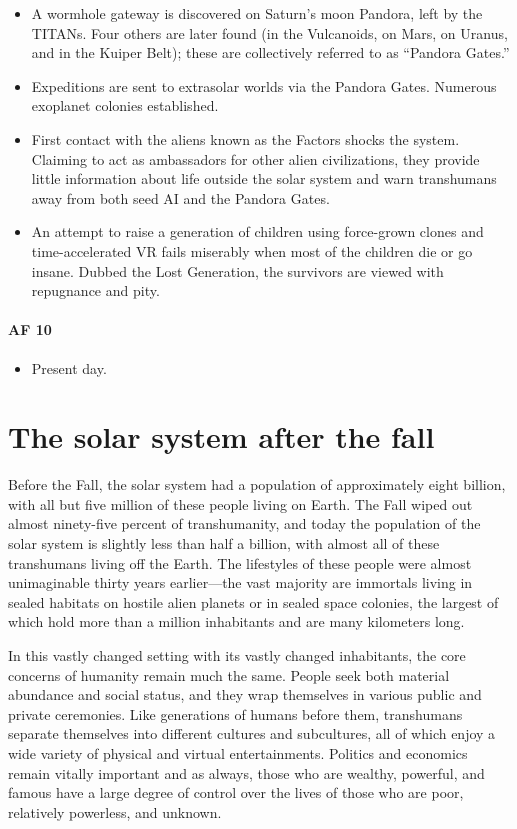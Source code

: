 \begin{itemize}
\item A wormhole gateway is discovered on Saturn's moon Pandora, left by the TITANs. Four others are later found (in the Vulcanoids, on Mars, on Uranus, and in the Kuiper Belt); these are collectively referred to as ``Pandora Gates.''
\item Expeditions are sent to extrasolar worlds via the Pandora Gates. Numerous exoplanet colonies established.
\item First contact with the aliens known as the Factors shocks the system. Claiming to act as ambassadors for other alien civilizations, they provide little information about life outside the solar system and warn transhumans away from both seed AI and the Pandora Gates.
\item An attempt to raise a generation of children using force-grown clones and time-accelerated VR fails miserably when most of the children die or go insane. Dubbed the Lost Generation, the survivors are viewed with repugnance and pity.
\end{itemize}  \paragraph{AF 10}  \begin{itemize}
\item Present day.
\end{itemize} 

\section{The solar system after the fall}
\label{sec:solar-system-after} 

Before the Fall, the solar system had a population of approximately eight billion, with all but five million of these people living on Earth. The Fall wiped out almost ninety-five percent of transhumanity, and today the population of the solar system is slightly less than half a billion, with almost all of these transhumans living off the Earth. The lifestyles of these people were almost unimaginable thirty years earlier—the vast majority are immortals living in sealed habitats on hostile alien planets or in sealed space colonies, the largest of which hold more than a million inhabitants and are many kilometers long. 

In this vastly changed setting with its vastly changed inhabitants, the core concerns of humanity remain much the same. People seek both material abundance and social status, and they wrap themselves in various public and private ceremonies. Like generations of humans before them, transhumans separate themselves into different cultures and subcultures, all of which enjoy a wide variety of physical and virtual entertainments. Politics and economics remain vitally important and as always, those who are wealthy, powerful, and famous have a large degree of control over the lives of those who are poor, relatively powerless, and unknown. 

